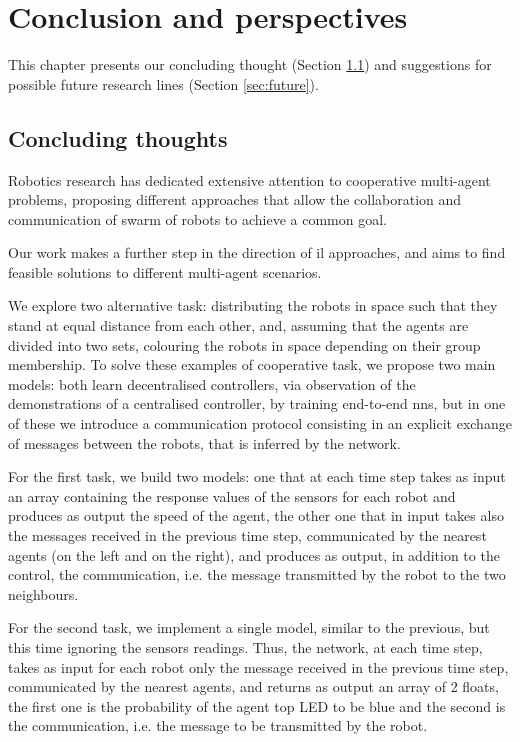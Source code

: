 \chapter{Conclusion and perspectives}
\label{chap:concl}
 
This chapter presents our concluding thought (Section \ref{sec:concl}) and 
suggestions for possible future research lines (Section \ref{sec:future}).

\section{Concluding thoughts}
\label{sec:concl}
Robotics research has dedicated extensive attention to cooperative multi-agent 
problems, proposing different approaches that allow the collaboration and 
communication of swarm of robots to achieve a common goal.

Our work makes a further step in the direction of \gls{il} approaches, and aims to 
find feasible solutions to different multi-agent scenarios.

We explore two alternative task: distributing the robots in space such that they 
stand at equal distance from each other, and, assuming that the agents are 
divided into two sets, colouring the robots in space depending on their group 
membership.
To solve these examples of cooperative task, we propose two main models: both 
learn decentralised controllers, via observation of the demonstrations of a 
centralised controller, by training end-to-end \glspl{nn}, but in one of these we 
introduce a communication protocol consisting in an explicit exchange of 
messages between the robots, that is inferred by the network.

For the first task, we build two models: one that at each time step takes as input 
an array containing the response values of the sensors for each robot and 
produces as output the speed of the agent, the other one that in input takes also 
the messages received in the previous time step, communicated by the nearest 
agents (on the left and on the right), and produces as output, in addition to the 
control, the communication, i.e. the message transmitted by the robot to the two 
neighbours. 

For the second task, we implement a single model, similar to the previous, but this 
time ignoring the sensors readings. Thus, the network, at each time step, takes as 
input for each robot only the message received in the previous time step, 
communicated by the nearest agents, and returns as output an array of 2 floats, 
the first one is the probability of the agent top LED to be blue and the second is 
the communication, i.e. the message to be transmitted by the robot.

